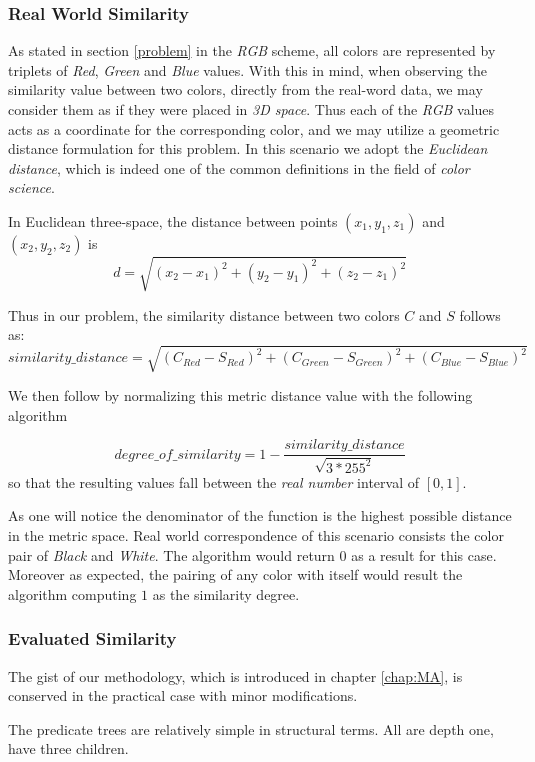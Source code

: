 \documentclass[egilmezThesis.tex]{subfiles}
\begin{document}
\subsubsection{Real World Similarity}
\label{rws}
As stated in section \ref{problem} in the \textit{RGB} scheme, all colors are represented by triplets of  \textit{Red}, \textit{Green} and \textit{Blue} values. With this in mind, when observing the similarity value between two colors, directly from the real-word data, we may consider them as if they were placed in \textit{3D space}. Thus each of the \textit{RGB} values acts as a coordinate for the corresponding color, and we may utilize a geometric distance formulation for this problem. In this scenario we adopt the \textit{Euclidean distance}, which is indeed one of the common definitions in the field of \textit{color science}. \cite{Sha02}

In Euclidean three-space, the distance between points $(x_1, y_1, z_1)$ and $(x_2, y_2, z_2)$ is
$$d=\sqrt{(x_2-x_1)^2+(y_2-y_1)^2+(z_2-z_1)^2}$$

Thus in our problem, the similarity distance between two colors $C$ and $S$ follows as:
$$similarity\_distance=\sqrt{(C_{Red}-S_{Red})^2+(C_{Green}-S_{Green})^2+(C_{Blue}-S_{Blue})^2}$$

We then follow by normalizing this metric distance value with the following algorithm

$$degree\_of\_similarity = 1 - \frac{similarity\_distance}{\sqrt{3*255^2}}$$
so that the resulting values fall between the \textit{real number} interval of $[0,1]$.

As one will notice the denominator of the function is the highest possible distance in the metric space. Real world correspondence of this scenario consists the color pair of \textit{Black} and \textit{White}. The algorithm would return $0$ as a result for this case. Moreover as expected, the pairing of any color with itself would result the algorithm computing $1$ as the similarity degree.

\subsubsection{Evaluated Similarity}
\label{evalSimPrac}

The gist of our methodology, which is introduced in chapter \ref{chap:MA}, is conserved in the practical case with minor modifications.

The predicate trees are relatively simple in structural terms. All are depth one, have three children.
\end{document}
